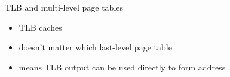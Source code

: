 \begin{frame}{TLB and multi-level page tables}
    \begin{itemize}
    \item TLB caches 
    \item doesn't matter which last-level page table
        \vspace{.5cm}
    \item means TLB output can be used directly to form address
    \end{itemize}
\end{frame}
